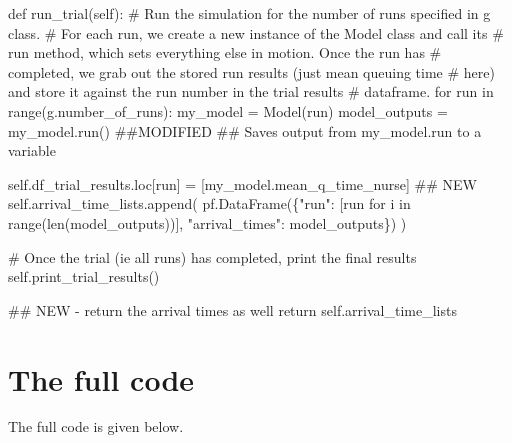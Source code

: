 \documentclass[
  letterpaper,
  DIV=11,
  numbers=noendperiod]{scrreprt}
\newenvironment{Shaded}{\begin{snugshade}}{\end{snugshade}}
\newcommand{\BuiltInTok}[1]{\textcolor[rgb]{0.00,0.23,0.31}{#1}}
\newcommand{\CommentTok}[1]{\textcolor[rgb]{0.37,0.37,0.37}{#1}}
\newcommand{\ControlFlowTok}[1]{\textcolor[rgb]{0.00,0.23,0.31}{#1}}
\newcommand{\KeywordTok}[1]{\textcolor[rgb]{0.00,0.23,0.31}{#1}}
\newcommand{\NormalTok}[1]{\textcolor[rgb]{0.00,0.23,0.31}{#1}}
\newcommand{\OperatorTok}[1]{\textcolor[rgb]{0.37,0.37,0.37}{#1}}
\newcommand{\StringTok}[1]{\textcolor[rgb]{0.13,0.47,0.30}{#1}}
\newcommand{\VariableTok}[1]{\textcolor[rgb]{0.07,0.07,0.07}{#1}}
\begin{document}
\begin{Shaded}
\begin{Highlighting}[]
\KeywordTok{def}\NormalTok{ run\_trial(}\VariableTok{self}\NormalTok{):}
    \CommentTok{\# Run the simulation for the number of runs specified in g class.}
    \CommentTok{\# For each run, we create a new instance of the Model class and call its}
    \CommentTok{\# run method, which sets everything else in motion.  Once the run has}
    \CommentTok{\# completed, we grab out the stored run results (just mean queuing time}
    \CommentTok{\# here) and store it against the run number in the trial results}
    \CommentTok{\# dataframe.}
    \ControlFlowTok{for}\NormalTok{ run }\KeywordTok{in} \BuiltInTok{range}\NormalTok{(g.number\_of\_runs):}
\NormalTok{        my\_model }\OperatorTok{=}\NormalTok{ Model(run)}
\NormalTok{        model\_outputs }\OperatorTok{=}\NormalTok{ my\_model.run() }\CommentTok{\#\#MODIFIED}
        \CommentTok{\#\# Saves output from my\_model.run to a variable}

        \VariableTok{self}\NormalTok{.df\_trial\_results.loc[run] }\OperatorTok{=}\NormalTok{ [my\_model.mean\_q\_time\_nurse]}
        \CommentTok{\#\# NEW}
        \VariableTok{self}\NormalTok{.arrival\_time\_lists.append(}
\NormalTok{              pf.DataFrame(\{}\StringTok{"run"}\NormalTok{: [run }\ControlFlowTok{for}\NormalTok{ i }\KeywordTok{in} \BuiltInTok{range}\NormalTok{(}\BuiltInTok{len}\NormalTok{(model\_outputs))], }\StringTok{"arrival\_times"}\NormalTok{: model\_outputs\})}
\NormalTok{              )}

    \CommentTok{\# Once the trial (ie all runs) has completed, print the final results}
    \VariableTok{self}\NormalTok{.print\_trial\_results()}

    \CommentTok{\#\# NEW {-} return the arrival times as well}
    \ControlFlowTok{return} \VariableTok{self}\NormalTok{.arrival\_time\_lists}
\end{Highlighting}
\end{Shaded}

\section{The full code}\label{the-full-code-1}

The full code is given below.
\end{document}
